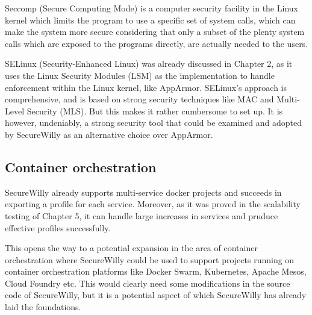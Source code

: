 Seccomp (Secure Computing Mode) is a computer security facility in the Linux kernel which limits the program to use a specific set of system calls, which can make the system more secure considering that only a subset of the plenty system calls which are exposed to the programs directly, are actually needed to the users.

SELinux (Security-Enhanced Linux) was already discussed in Chapter 2, as it uses the Linux Security Modules (LSM) as the implementation to handle enforcement within the Linux kernel, like AppArmor. SELinux's approach is comprehensive, and is based on strong security techniques like MAC and Multi-Level Security (MLS). But this makes it rather cumbersome to set up. \cite{appsel} It is however, undeniably, a strong security tool that could be examined and adopted by SecureWilly as an alternative choice over AppArmor.

\subsection{Container orchestration}
SecureWilly already supports multi-service docker projects and succeeds in exporting a profile for each service. Moreover, as it was proved in the scalability testing of Chapter 5, it can handle large increases in services and pruduce effective profiles successfully.

This opens the way to a potential expansion in the area of container orchestration where SecureWilly could be used to support projects running on container orchestration platforms like Docker Swarm, Kubernetes, Apache Mesos, Cloud Foundry etc. This would clearly need some modifications in the source code of SecureWilly, but it is a potential aspect of which SecureWilly has already laid the foundations.
